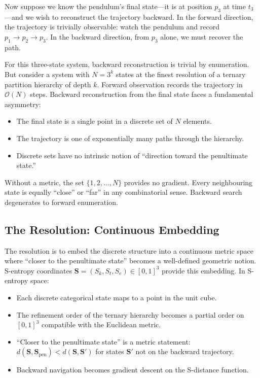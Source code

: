 \documentclass[12pt,twocolumn]{article}
\begin{document}
Now suppose we know the pendulum's final state---it is at position $p_3$ at time $t_3$---and we wish to reconstruct the trajectory backward. In the forward direction, the trajectory is trivially observable: watch the pendulum and record $p_1 \to p_2 \to p_3$. In the backward direction, from $p_3$ alone, we must recover the path.

For this three-state system, backward reconstruction is trivial by enumeration. But consider a system with $N = 3^k$ states at the finest resolution of a ternary partition hierarchy of depth $k$. Forward observation records the trajectory in $\mathcal{O}(N)$ steps. Backward reconstruction from the final state faces a fundamental asymmetry:

\begin{itemize}
\item The final state is a single point in a discrete set of $N$ elements.
\item The trajectory is one of exponentially many paths through the hierarchy.
\item Discrete sets have no intrinsic notion of ``direction toward the penultimate state.''
\end{itemize}

Without a metric, the set $\{1, 2, \ldots, N\}$ provides no gradient. Every neighbouring state is equally ``close'' or ``far'' in any combinatorial sense. Backward search degenerates to forward enumeration.

\subsection{The Resolution: Continuous Embedding}

The resolution is to embed the discrete structure into a continuous metric space where ``closer to the penultimate state'' becomes a well-defined geometric notion. S-entropy coordinates $\mathbf{S} = (S_k, S_t, S_e) \in [0,1]^3$ provide this embedding. In S-entropy space:

\begin{itemize}
\item Each discrete categorical state maps to a point in the unit cube.
\item The refinement order of the ternary hierarchy becomes a partial order on $[0,1]^3$ compatible with the Euclidean metric.
\item ``Closer to the penultimate state'' is a metric statement: $d(\mathbf{S}, \mathbf{S}_{\text{pen}}) < d(\mathbf{S}, \mathbf{S}')$ for states $\mathbf{S}'$ not on the backward trajectory.
\item Backward navigation becomes gradient descent on the S-distance function.
\end{itemize}
\end{document}
